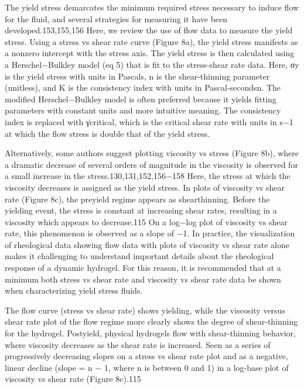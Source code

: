 \documentclass[../../main-notes.tex]{subfiles}
\begin{document}
The yield stress demarcates the minimum required stress necessary to induce flow for the fluid, and several strategies for  measuring it have been developed.153,155,156 
Here, we review the use of flow data to measure the yield stress. 
Using a stress vs shear rate curve (Figure 8a), the yield stress manifests as a nonzero intercept with the stress axis. 
The yield stress is then calculated using a Herschel−Bulkley model (eq 5) that is fit to the stress-shear rate data. 
Here, σy is the yield stress with units in Pascals, n is the shear-thinning parameter (unitless), and K is the consistency index with units in Pascal-secondsn. 
The modified Herschel−Bulkley model is often preferred because it yields fitting parameters with constant units and more intuitive meaning. 
The consistency index is replaced with γ̇critical, which  is the critical shear rate with units in s−1 at which the flow stress is double that of the yield stress. 

Alternatively, some authors suggest plotting viscosity vs stress (Figure 8b), where a dramatic decrease of several orders of magnitude in the viscosity is observed for a small increase in the  stress.130,131,152,156−158 
Here, the stress at which the viscosity decreases is assigned as the yield stress. 
In plots of viscosity vs shear rate (Figure 8c), the preyield regime appears as shearthinning. 
Before the yielding event, the stress is constant at increasing shear rates, resulting in a viscosity which appears to  decrease.115 
On a log−log plot of viscosity vs shear rate, this phenomenon is observed as a slope of −1. 
In practice, the visualization of rheological data showing flow data with plots of viscosity vs shear rate alone makes it challenging to understand important details about the rheological response of a dynamic hydrogel. 
For this reason, it is recommended thatat a minimumboth stress vs shear rate and viscosity vs shear rate data be shown when characterizing yield stress fluids. 

The flow curve (stress vs shear rate) shows yielding, while the viscosity versus shear rate plot of the flow regime more clearly shows the degree of shear-thinning for the hydrogel. 
Postyield, physical hydrogels flow with shear-thinning behavior, where viscosity decreases as the shear rate is increased. 
Seen as a series of progressively decreasing slopes on a stress vs shear rate plot and as a negative, linear decline (slope = n − 1, where n is between 0 and 1) in a log-base plot  of viscosity vs shear rate (Figure 8c).115 
\end{document}
